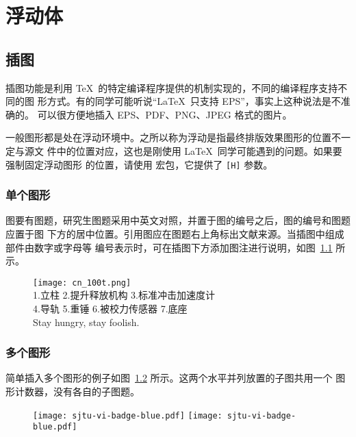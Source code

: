 
\chapter{浮动体}

\section{插图}

插图功能是利用 \TeX\ 的特定编译程序提供的机制实现的，不同的编译程序支持不同的图
形方式。有的同学可能听说“\LaTeX\ 只支持 EPS”，事实上这种说法是不准确的。\XeTeX
可以很方便地插入 EPS、PDF、PNG、JPEG 格式的图片。

一般图形都是处在浮动环境中。之所以称为浮动是指最终排版效果图形的位置不一定与源文
件中的位置对应，这也是刚使用 \LaTeX\ 同学可能遇到的问题。如果要强制固定浮动图形
的位置，请使用  宏包，它提供了 \texttt{[H]} 参数。

\subsection{单个图形}

图要有图题，研究生图题采用中英文对照，并置于图的编号之后，图的编号和图题应置于图
下方的居中位置。引用图应在图题右上角标出文献来源。当插图中组成部件由数字或字母等
编号表示时，可在插图下方添加图注进行说明，如图~\ref{fig:cn_100t} 所示。

\begin{figure}[!htp]
  \centering
  \texttt{[image: cn\_100t.png]} \\
    1.立柱 2.提升释放机构 3.标准冲击加速度计 \\
    4.导轨 5.重锤 6.被校力传感器 7.底座 \\
    {Stay hungry, stay foolish.}
 \label{fig:cn_100t}
\end{figure}

\subsection{多个图形}

简单插入多个图形的例子如图~\ref{fig:SRR} 所示。这两个水平并列放置的子图共用一个
图形计数器，没有各自的子图题。

\begin{figure}[!htp]
  \centering
  \texttt{[image: sjtu-vi-badge-blue.pdf]}
  \hspace{1cm}
  \texttt{[image: sjtu-vi-badge-blue.pdf]}
  \label{fig:SRR}
\end{figure}

